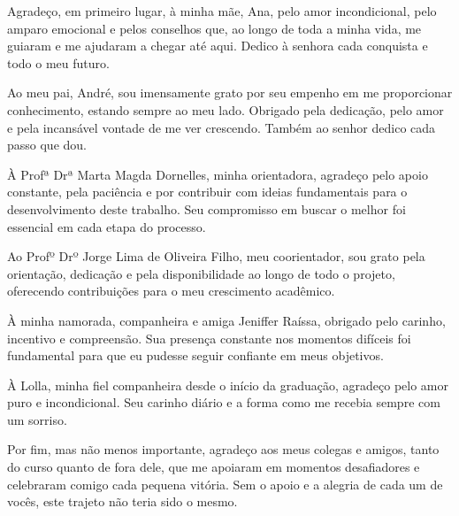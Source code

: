 \begin{agradecimentos}
Agradeço, em primeiro lugar, à minha mãe, Ana, pelo amor incondicional, pelo amparo emocional e pelos conselhos que, ao longo de toda a minha vida, me guiaram e me ajudaram a chegar até aqui. Dedico à senhora cada conquista e todo o meu futuro.

Ao meu pai, André, sou imensamente grato por seu empenho em me proporcionar conhecimento, estando sempre ao meu lado. Obrigado pela dedicação, pelo amor e pela incansável vontade de me ver crescendo. Também ao senhor dedico cada passo que dou.

À Profª Drª Marta Magda Dornelles, minha orientadora, agradeço pelo apoio constante, pela paciência e por contribuir com ideias fundamentais para o desenvolvimento deste trabalho. Seu compromisso em buscar o melhor foi essencial em cada etapa do processo.

Ao Profº Drº Jorge Lima de Oliveira Filho, meu coorientador, sou grato pela orientação, dedicação e pela disponibilidade ao longo de todo o projeto, oferecendo contribuições para o meu crescimento acadêmico.

À minha namorada, companheira e amiga Jeniffer Raíssa, obrigado pelo carinho, incentivo e compreensão. Sua presença constante nos momentos difíceis foi fundamental para que eu pudesse seguir confiante em meus objetivos.

À Lolla, minha fiel companheira desde o início da graduação, agradeço pelo amor puro e incondicional. Seu carinho diário e a forma como me recebia sempre com um sorriso.

Por fim, mas não menos importante, agradeço aos meus colegas e amigos, tanto do curso quanto de fora dele, que me apoiaram em momentos desafiadores e celebraram comigo cada pequena vitória. Sem o apoio e a alegria de cada um de vocês, este trajeto não teria sido o mesmo.
\end{agradecimentos}
